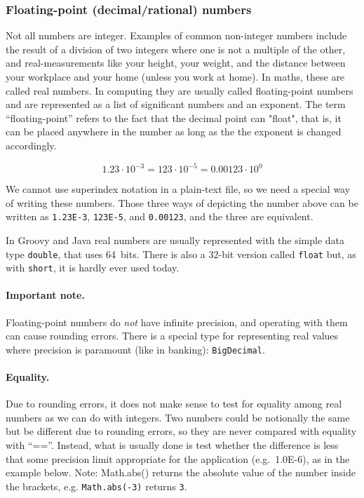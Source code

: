 \subsubsection{Floating-point (decimal/rational) numbers}
\label{sec:float-point-decim}

Not all numbers are integer. Examples of common non-integer numbers
include the result of a division of two integers where one is not a
multiple of the other, and real-measurements like your height, your
weight, and the distance between your workplace and your home (unless
you work at home). In maths, these are called real numbers. In
computing they are usually called floating-point numbers and are
represented as a list of significant numbers and an exponent. The term
``floating-point'' refers to the fact that the decimal point can "float",
that is, it can be placed anywhere in the number as long as the the
exponent is changed accordingly. 

$$ 1.23 \cdot 10^{-3} = 123 \cdot 10^{-5} = 0.00123 \cdot 10^0 $$

We cannot use superindex notation in a plain-text file, so we need a
special way of writing these numbers. 
Those three ways of depicting the number above can be written
as \verb+1.23E-3+, \verb+123E-5+, and \verb+0.00123+, and the three are
equivalent. 

In Groovy and Java real numbers are usually represented with the
simple data type \verb+double+, that uses 64~bits. There is also a
32-bit version called \verb+float+ but, as with \verb+short+, it is
hardly ever used today.

\paragraph{Important note.} 

Floating-point numbers do \emph{not} have infinite precision, and
operating with them can cause rounding errors. There is a special type
for representing real values where precision is paramount (like in
banking): \verb+BigDecimal+. 

\paragraph{Equality. }

Due to rounding errors, it does not make sense to test for equality
among real numbers as we can do with integers. Two numbers could be
notionally the same but be different due to rounding errors, so they
are never compared with equality with ``==''. Instead, what is
usually done is test whether the difference is less that some
precision limit appropriate for the application (e.g.~1.0E-6), as in
the example below. Note: Math.abs() returns the absolute value of the
number inside the brackets, e.g. \verb+Math.abs(-3)+ returns \verb+3+. 

